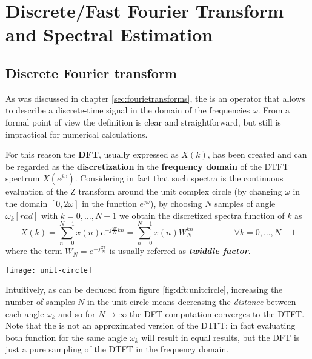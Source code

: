 \chapter{Discrete/Fast Fourier Transform and Spectral Estimation}
\section{Discrete Fourier transform}
	
	As was discussed in chapter \ref{sec:fourietransforms}, the \dtft is an operator that allows to describe a discrete-time signal in the domain of the frequencies $\omega$. From a formal point of view the definition is clear and straightforward, but still is impractical for numerical calculations.
	
	For this reason the  \textbf{DFT}, usually expressed as $X(k)$, has been created and can be regarded as the \textbf{discretization} in the \textbf{frequency domain} of the DTFT spectrum $X(e^{j\omega})$. Considering in fact that such spectra is the continuous evaluation of the Z transform around the unit complex circle (by changing $\omega$ in the domain $[0,2\omega]$ in the function $e^{j\omega}$), by choosing $N$ samples of angle $\omega_k[rad]$ with $k=0,\dots,N-1$ we obtain the discretized spectra function of $k$ as
	\begin{equation} \label{eq:dft:dft}
		X(k) = \sum_{n=0}^{N-1} x(n) e^{-j\frac{2\pi}Nkn} = \sum_{n=0}^{N-1} x(n) W_{N}^{kn} \hspace{2cm} \forall k = 0,\dots, N-1
	\end{equation}
	where the term $W_N = e^{-j\frac{2\pi}{N}}$ is usually referred as \textit{\textbf{twiddle factor}}.
	\begin{SCfigure}[2][bht]
		\centering \texttt{[image: unit-circle]}
		\caption{point on the Z plane on which the DFT is evaluated in order to have a \dft.} \label{fig:dft:unitcircle}
	\end{SCfigure}
	
	Intuitively, as can be deduced from figure \ref{fig:dft:unitcircle}, increasing the number of samples $N$ in the unit circle means decreasing the \textit{distance} between each angle $\omega_k$ and so for $N\rightarrow \infty$ the DFT computation converges to the DTFT.\\
	Note that the \dft is not an approximated version of the DTFT: in fact evaluating both function for the same angle $\omega_k$ will result in equal results, but the DFT is just a pure sampling of the DTFT in the frequency domain.
	

